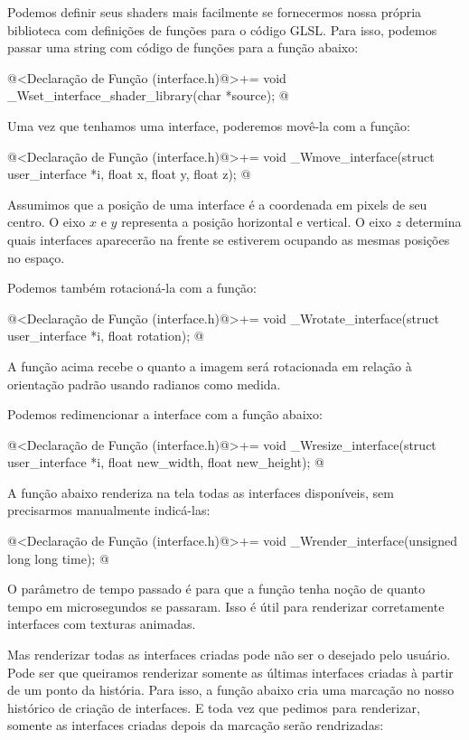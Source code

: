 Podemos definir seus shaders mais facilmente se fornecermos nossa
própria biblioteca com definições de funções para o código GLSL. Para
isso, podemos passar uma string com código de funções para a função
abaixo:

\iniciocodigo
@<Declaração de Função (interface.h)@>+=
void _Wset_interface_shader_library(char *source);
@
\fimcodigo

Uma vez que tenhamos uma interface, poderemos movê-la com a função:

\iniciocodigo
@<Declaração de Função (interface.h)@>+=
void _Wmove_interface(struct user_interface *i, float x, float y, float z);
@
\fimcodigo

Assumimos que a posição de uma interface é a coordenada em pixels de
seu centro. O eixo $x$ e $y$ representa a posição horizontal e
vertical. O eixo $z$ determina quais interfaces aparecerão na frente
se estiverem ocupando as mesmas posições no espaço.

Podemos também rotacioná-la com a função:

\iniciocodigo
@<Declaração de Função (interface.h)@>+=
void _Wrotate_interface(struct user_interface *i, float rotation);
@
\fimcodigo

A função acima recebe o quanto a imagem será rotacionada em relação à
orientação padrão usando radianos como medida.

Podemos redimencionar a interface com a função abaixo:

\iniciocodigo
@<Declaração de Função (interface.h)@>+=
void _Wresize_interface(struct user_interface *i,
                        float new_width, float new_height);
@
\fimcodigo

A função abaixo renderiza na tela todas as interfaces disponíveis, sem
precisarmos manualmente indicá-las:

\iniciocodigo
@<Declaração de Função (interface.h)@>+=
void _Wrender_interface(unsigned long long time);
@
\fimcodigo

O parâmetro de tempo passado é para que a função tenha noção de quanto
tempo em microsegundos se passaram. Isso é útil para renderizar
corretamente interfaces com texturas animadas.

Mas renderizar todas as interfaces criadas pode não ser o desejado
pelo usuário. Pode ser que queiramos renderizar somente as últimas
interfaces criadas à partir de um ponto da história.  Para isso, a
função abaixo cria uma marcação no nosso histórico de criação de
interfaces. E toda vez que pedimos para renderizar, somente as
interfaces criadas depois da marcação serão rendrizadas:

